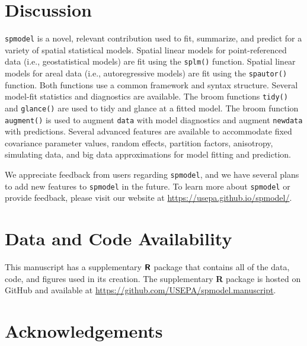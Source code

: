 \documentclass[10pt,letterpaper]{article}
\begin{document}
\hypertarget{sec:discussion}{%
\section{Discussion}\label{sec:discussion}}

\texttt{spmodel} is a novel, relevant contribution used to fit,
summarize, and predict for a variety of spatial statistical models.
Spatial linear models for point-referenced data (i.e., geostatistical
models) are fit using the \texttt{splm()} function. Spatial linear
models for areal data (i.e., autoregressive models) are fit using the
\texttt{spautor()} function. Both functions use a common framework and
syntax structure. Several model-fit statistics and diagnostics are
available. The broom functions \texttt{tidy()} and \texttt{glance()} are
used to tidy and glance at a fitted model. The broom function
\texttt{augment()} is used to augment \texttt{data} with model
diagnostics and augment \texttt{newdata} with predictions. Several
advanced features are available to accommodate fixed covariance
parameter values, random effects, partition factors, anisotropy,
simulating data, and big data approximations for model fitting and
prediction.

We appreciate feedback from users regarding \texttt{spmodel}, and we
have several plans to add new features to \texttt{spmodel} in the
future. To learn more about \texttt{spmodel} or provide feedback, please
visit our website at \url{https://usepa.github.io/spmodel/}.

\hypertarget{data-and-code-availability}{%
\section*{Data and Code Availability}\label{data-and-code-availability}}

This manuscript has a supplementary \(\textbf{\textsf{R}}\) package that
contains all of the data, code, and figures used in its creation. The
supplementary \textbf{\textsf{R}} package is hosted on GitHub and
available at \url{https://github.com/USEPA/spmodel.manuscript}.

\hypertarget{acknowledgements}{%
\section*{Acknowledgements}\label{acknowledgements}}
\end{document}
